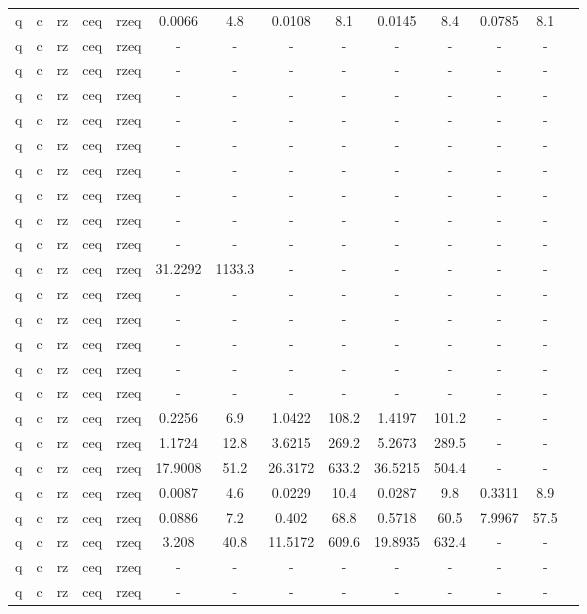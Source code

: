 \begin{table}[htb]
{\begin{tabular}{|c|c|c|c|c|c|c|c|c|c|c|c|c|c|}
q & c & rz & ceq & rzeq & 0.0066 & 4.8 & 0.0108 & 8.1 & 0.0145 & 8.4 & 0.0785 & 8.1 \\ 
q & c & rz & ceq & rzeq & - & - & - & - & - & - & - & - \\ 
q & c & rz & ceq & rzeq & - & - & - & - & - & - & - & - \\ 
q & c & rz & ceq & rzeq & - & - & - & - & - & - & - & - \\ 
q & c & rz & ceq & rzeq & - & - & - & - & - & - & - & - \\ 
q & c & rz & ceq & rzeq & - & - & - & - & - & - & - & - \\ 
q & c & rz & ceq & rzeq & - & - & - & - & - & - & - & - \\ 
q & c & rz & ceq & rzeq & - & - & - & - & - & - & - & - \\ 
q & c & rz & ceq & rzeq & - & - & - & - & - & - & - & - \\ 
q & c & rz & ceq & rzeq & - & - & - & - & - & - & - & - \\ 
q & c & rz & ceq & rzeq & 31.2292 & 1133.3 & - & - & - & - & - & - \\ 
q & c & rz & ceq & rzeq & - & - & - & - & - & - & - & - \\ 
q & c & rz & ceq & rzeq & - & - & - & - & - & - & - & - \\ 
q & c & rz & ceq & rzeq & - & - & - & - & - & - & - & - \\ 
q & c & rz & ceq & rzeq & - & - & - & - & - & - & - & - \\ 
q & c & rz & ceq & rzeq & - & - & - & - & - & - & - & - \\ 
q & c & rz & ceq & rzeq & 0.2256 & 6.9 & 1.0422 & 108.2 & 1.4197 & 101.2 & - & - \\ 
q & c & rz & ceq & rzeq & 1.1724 & 12.8 & 3.6215 & 269.2 & 5.2673 & 289.5 & - & - \\ 
q & c & rz & ceq & rzeq & 17.9008 & 51.2 & 26.3172 & 633.2 & 36.5215 & 504.4 & - & - \\ 
q & c & rz & ceq & rzeq & 0.0087 & 4.6 & 0.0229 & 10.4 & 0.0287 & 9.8 & 0.3311 & 8.9 \\ 
q & c & rz & ceq & rzeq & 0.0886 & 7.2 & 0.402 & 68.8 & 0.5718 & 60.5 & 7.9967 & 57.5 \\ 
q & c & rz & ceq & rzeq & 3.208 & 40.8 & 11.5172 & 609.6 & 19.8935 & 632.4 & - & - \\ 
q & c & rz & ceq & rzeq & - & - & - & - & - & - & - & - \\ 
q & c & rz & ceq & rzeq & - & - & - & - & - & - & - & - \\ 

\end{tabular}}
\end{table}
